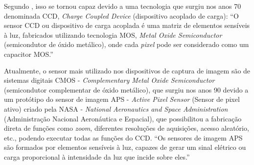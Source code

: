 Segundo , isso se tornou capaz devido a uma tecnologia que surgiu nos anos 70 denominada CCD, \textit{Charge Coupled Device} (dispositivo acoplado de carga): “O sensor CCD ou dispositivo de carga acoplada é uma matriz de elementos sensíveis à luz, fabricados utilizando tecnologia MOS, \textit{Metal Oxide Semiconductor} (semicondutor de óxido metálico), onde cada \textit{pixel} pode ser considerado como um capacitor MOS.”

Atualmente, o sensor mais utilizado nos dispositivos de captura de imagem são de sistemas digitais CMOS - \textit{Complementary Metal Oxide Semiconductor} (semicondutor complementar de óxido metálico), que surgiu nos anos 90 devido a um protótipo do sensor de imagem APS - \textit{Active Pixel Sensor} (Sensor de pixel ativo) criado pela NASA - \textit{National Aeronautics and Space Administration} (Administração Nacional Aeronáutica e Espacial), que possibilitou a fabricação direta de funções como \textit{zoom}, diferentes resoluções de aquisições, acesso aleatório, etc., podendo executar todas as funções do CCD. “Os sensores de imagem APS são formados por elementos sensíveis à luz, capazes de gerar um sinal elétrico ou carga proporcional à intensidade da luz que incide sobre eles.” \cite{CHMIELEWSKI2009}
